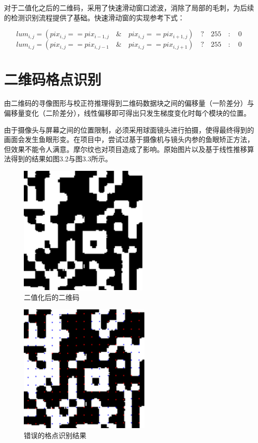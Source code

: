 对于二值化之后的二维码，采用了快速滑动窗口滤波，消除了局部的毛刺，为后续的检测识别流程提供了基础。快速滑动窗的实现参考下式：

$$
lum_{i,j}= (pix_{i,j} == pix_{i-1,j}\quad \&\quad pix_{i,j} == pix_{i+1,j})\quad?\quad 255\quad : \quad 0
$$
$$
lum_{i,j}= (pix_{i,j} == pix_{i,j-1}\quad \&\quad pix_{i,j} == pix_{i,j+1})\quad?\quad 255\quad : \quad 0
$$

\section{二维码格点识别}

由二维码的寻像图形与校正符推理得到二维码数据块之间的偏移量（一阶差分）与偏移量变化（二阶差分），线性偏移即可得出只发生梯度变化时每个模块的位置。

由于摄像头与屏幕之间的位置限制，必须采用球面镜头进行拍摄，使得最终得到的画面会发生鱼眼形变。在项目中，尝试过基于摄像机与镜头内参的鱼眼矫正方法，但效果不能令人满意。摩尔纹也对项目造成了影响\cite{zhang2022mobiscan}。原始图片以及基于线性推移算法得到的结果如图3.2与图3.3所示。

\begin{figure}[!htbp]
\centering
\includegraphics[scale=1]{figures/QR_Cap_00.png}
\caption{二值化后的二维码}
\end{figure}
\begin{figure}[!htbp]
\centering
\includegraphics[scale=1]{figures/QR_Cap_GF.png}
\caption{错误的格点识别结果}
\end{figure}

